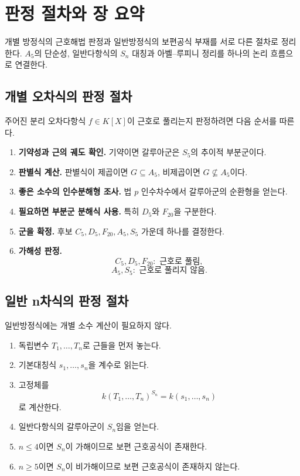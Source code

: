 \clearpage
\section{판정 절차와 장 요약}
\label{sec:abel-ruffini-workflow-review}

\begin{learninggoal}
개별 방정식의 근호해법 판정과 일반방정식의 보편공식 부재를 서로 다른 절차로 정리한다. $A_5$의 단순성, 일반다항식의 $S_n$ 대칭과 아벨--루피니 정리를 하나의 논리 흐름으로 연결한다.
\end{learninggoal}

\subsection{개별 오차식의 판정 절차}

주어진 분리 오차다항식 $f\in K[X]$이 근호로 풀리는지 판정하려면 다음 순서를 따른다.

\begin{enumerate}[label=\textbf{단계 \arabic*.},leftmargin=3.8em]
  \item \textbf{기약성과 근의 궤도 확인.} 기약이면 갈루아군은 $S_5$의 추이적 부분군이다.
  \item \textbf{판별식 계산.} 판별식이 제곱이면 $G\subseteq A_5$, 비제곱이면 $G\not\subseteq A_5$이다.
  \item \textbf{좋은 소수의 인수분해형 조사.} 법 $p$ 인수차수에서 갈루아군의 순환형을 얻는다.
  \item \textbf{필요하면 부분군 분해식 사용.} 특히 $D_5$와 $F_{20}$을 구분한다.
  \item \textbf{군을 확정.} 후보 $C_5,D_5,F_{20},A_5,S_5$ 가운데 하나를 결정한다.
  \item \textbf{가해성 판정.}
  \[
    C_5,D_5,F_{20}:\text{ 근호로 풀림},
  \]
  \[
    A_5,S_5:\text{ 근호로 풀리지 않음}.
  \]
\end{enumerate}

\subsection{일반 n차식의 판정 절차}

일반방정식에는 개별 소수 계산이 필요하지 않다.

\begin{enumerate}[label=\textbf{단계 \arabic*.},leftmargin=3.8em]
  \item 독립변수 $T_1,\dots,T_n$로 근들을 먼저 놓는다.
  \item 기본대칭식 $s_1,\dots,s_n$을 계수로 읽는다.
  \item 고정체를
  \[
    k(T_1,\dots,T_n)^{S_n}=k(s_1,\dots,s_n)
  \]
  로 계산한다.
  \item 일반다항식의 갈루아군이 $S_n$임을 얻는다.
  \item $n\le4$이면 $S_n$이 가해이므로 보편 근호공식이 존재한다.
  \item $n\ge5$이면 $S_n$이 비가해이므로 보편 근호공식이 존재하지 않는다.
\end{enumerate}

